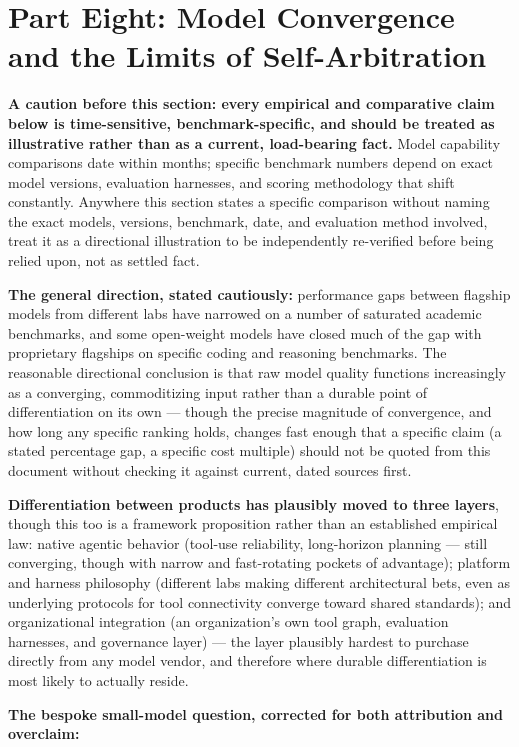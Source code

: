 \section{Part Eight: Model Convergence and the Limits of Self-Arbitration}

\textbf{A caution before this section: every empirical and comparative claim below is time-sensitive, benchmark-specific, and should be treated as illustrative rather than as a current, load-bearing fact.} Model capability comparisons date within months; specific benchmark numbers depend on exact model versions, evaluation harnesses, and scoring methodology that shift constantly. Anywhere this section states a specific comparison without naming the exact models, versions, benchmark, date, and evaluation method involved, treat it as a directional illustration to be independently re-verified before being relied upon, not as settled fact.

\textbf{The general direction, stated cautiously:} performance gaps between flagship models from different labs have narrowed on a number of saturated academic benchmarks, and some open-weight models have closed much of the gap with proprietary flagships on specific coding and reasoning benchmarks. The reasonable directional conclusion is that raw model quality functions increasingly as a converging, commoditizing input rather than a durable point of differentiation on its own --- though the precise magnitude of convergence, and how long any specific ranking holds, changes fast enough that a specific claim (a stated percentage gap, a specific cost multiple) should not be quoted from this document without checking it against current, dated sources first.

\textbf{Differentiation between products has plausibly moved to three layers}, though this too is a framework proposition rather than an established empirical law: native agentic behavior (tool-use reliability, long-horizon planning --- still converging, though with narrow and fast-rotating pockets of advantage); platform and harness philosophy (different labs making different architectural bets, even as underlying protocols for tool connectivity converge toward shared standards); and organizational integration (an organization's own tool graph, evaluation harnesses, and governance layer) --- the layer plausibly hardest to purchase directly from any model vendor, and therefore where durable differentiation is most likely to actually reside.

\textbf{The bespoke small-model question, corrected for both attribution and overclaim:}

